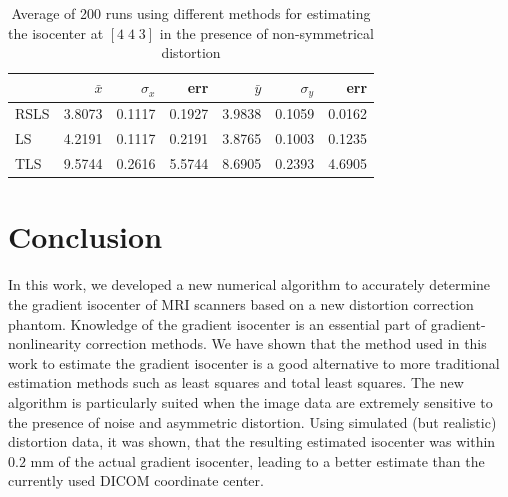 \begin{table}
  \begin{tabular} {| l | r | r | r | r | r | r |}
    \hline
    & $\bar{x}$ & $\sigma_x$ & err & $\bar{y}$ & $\sigma_y$ & err \\
    \hline
    RSLS & 3.8073 & 0.1117 & 0.1927   & 3.9838 & 0.1059 & 0.0162 \\
    \hline
    LS  & 4.2191 & 0.1117    & 0.2191 & 3.8765 & 0.1003 & 0.1235 \\
    \hline
    TLS  & 9.5744 & 0.2616 & 5.5744   & 8.6905 & 0.2393 & 4.6905 \\
    \hline
  \end{tabular}
  \caption{Average of 200 runs using different methods for estimating the isocenter at $[4 \; 4 \; 3]$ in the presence of non-symmetrical distortion } 
  \label{table:nonsymmetric}
\end{table}


\section{Conclusion}
In this work, we developed a new numerical algorithm to accurately determine the gradient isocenter
of MRI scanners based on a new distortion correction phantom. Knowledge of the gradient isocenter is an essential part of gradient-nonlinearity correction methods.  We have shown that the method used in this work to estimate the gradient isocenter is a good alternative to more traditional estimation methods such as least squares and total least squares. The new algorithm is particularly suited when the image data are extremely sensitive to the presence of noise and asymmetric distortion. Using simulated (but realistic) distortion data, it was shown, that the resulting estimated isocenter was within $0.2$ mm of the actual gradient isocenter, leading to a better estimate than the currently used DICOM coordinate center.
